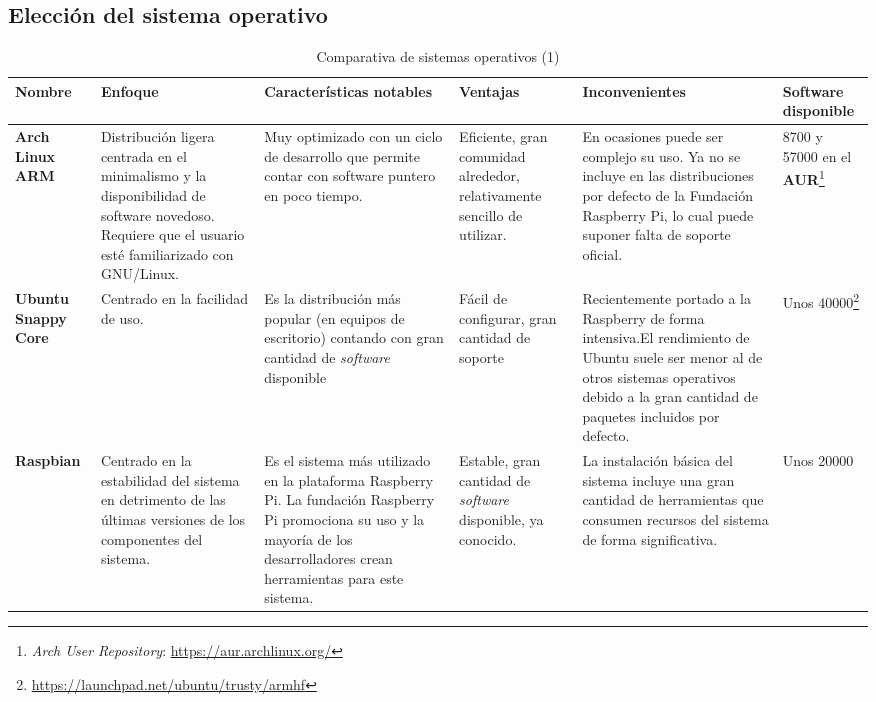 \begin{landscape}
\subsection{Elección del sistema operativo}
\label{os:evaluation}
\begin{table}[h]
\begin{tabular}{|p{1.7cm}|p{4.7cm}|p{4.7cm}|p{3cm}|p{5cm}|p{2cm}|}
\hline
\textbf{Nombre} & \textbf{Enfoque} & \textbf{Características notables} & \textbf{Ventajas} & \textbf{Inconvenientes} & \textbf{Software disponible}\\ \hline
\textbf{Arch Linux ARM} & Distribución ligera centrada en el minimalismo y la disponibilidad de software novedoso. Requiere que el usuario esté familiarizado con GNU/Linux. & Muy optimizado con un ciclo de desarrollo que permite contar con software puntero en poco tiempo. & Eficiente, gran comunidad alrededor, relativamente sencillo de utilizar. & En ocasiones puede ser complejo su uso. Ya no se incluye en las distribuciones por defecto de la Fundación Raspberry Pi, lo cual puede suponer falta de soporte oficial. & 8700 y 57000 en el \textbf{AUR}\footnote{\textit{Arch User Repository}: \href{https://aur.archlinux.org/}{https://aur.archlinux.org/}}\\ \hline


\textbf{Ubuntu Snappy Core} & Centrado en la facilidad de uso. & Es la distribución más popular (en equipos de escritorio) contando con gran cantidad de \textit{software} disponible & Fácil de configurar, gran cantidad de soporte & Recientemente portado a la Raspberry de forma intensiva.El rendimiento de Ubuntu suele ser menor al de otros sistemas operativos debido a la gran cantidad de paquetes incluidos por defecto. & Unos 40000\footnote{\href{https://launchpad.net/ubuntu/trusty/armhf}{https://launchpad.net/ubuntu/trusty/armhf}}\\ \hline 

\textbf{Raspbian} & Centrado en la estabilidad del sistema en detrimento de las últimas versiones de los componentes del sistema. & Es el sistema más utilizado en la plataforma Raspberry Pi. La fundación Raspberry Pi promociona su uso y la mayoría de los desarrolladores crean herramientas para este sistema. & Estable, gran cantidad de \textit{software} disponible, ya conocido. & La instalación básica del sistema incluye una gran cantidad de herramientas que consumen recursos del sistema de forma significativa. & Unos 20000\\ \hline
\end{tabular}
\caption{Comparativa de sistemas operativos (1)}
\end{table}
\end{landscape}

